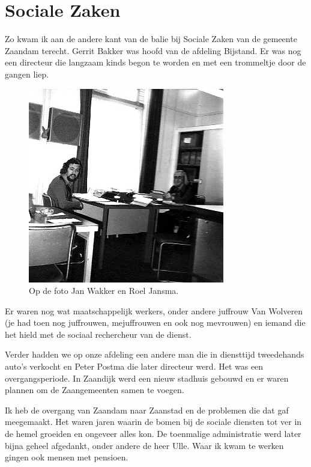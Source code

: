 \documentclass[10pt,twoside, openright]{memoir}
\begin{document}
\chapter{Sociale Zaken} %
\label{cha:socialezaken}

Zo kwam ik aan de andere kant van de balie bij Sociale Zaken van de gemeente Zaandam terecht. Gerrit Bakker was hoofd van de afdeling Bijstand. Er was nog een directeur die langzaam kinds begon te worden en met een trommeltje door de gangen liep. 

\begin{figure}
\includegraphics[width=\textwidth]{img/ch42/soos01}
\caption*{\footnotesize Op de foto Jan Wakker en Roel Jansma.}
\end{figure}

Er waren nog wat maatschappelijk werkers, onder andere juffrouw Van Wolveren (je had toen nog juffrouwen, mejuffrouwen en ook nog mevrouwen) en iemand die het hield met de sociaal rechercheur van de dienst. 

Verder hadden we op onze afdeling een andere man die in diensttijd tweedehands auto’s verkocht en Peter Postma die later directeur werd. Het was een overgangsperiode. In Zaandijk werd een nieuw stadhuis gebouwd en er waren plannen om de Zaangemeenten samen te voegen.

Ik heb de overgang van Zaandam naar Zaanstad en de problemen die dat gaf meegemaakt. Het waren jaren waarin de bomen bij de sociale diensten tot ver in de hemel groeiden en ongeveer alles kon. De toenmalige administratie werd later bijna geheel afgedankt, onder andere de heer Ulle. Waar ik kwam te werken gingen ook mensen met pensioen.
\end{document}
